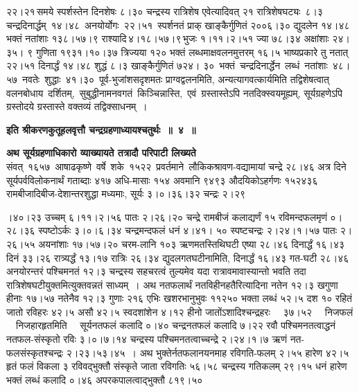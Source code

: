 \documentclass[11pt, openany]{book}
\begin{document}
\noindent २२।२१\textendash \,समये स्पर्शस्तेन दिनशेषः ८।३० चन्द्रस्य रात्रिशेष एवेत्यादिवत् २१ रात्रिशेषघट्यः \,८।३ \,चन्द्रदिनार्द्धम् \,१४।४८ \,अनयोर्योगः \,२२।५१ \,स्पर्शनतं प्राक् \;खाङ्कैर्गुणितं \;२००६।३० \;द्युदलेन \;१४।४८ \;भक्तं \;नतांशाः \;१३८।५७।९ राश्यादि\textendash \,४।१८।५७।९\textendash \,भुजः १।११।२।५१ ज्या ७८।३४ अक्षांशाः २४।३५। ९ गुणिता १९३१।१०।३७ त्रिज्यया १२० भक्तं लब्धमाक्षवलनमुत्तरम् १६।५ भाष्यप्रकारे तु नतात् २२।५१ दिनार्द्धं १४।४८ शुद्धं ८।३ खाङ्कैर्गुणितं ७२४। ३० \,भक्तं \,चन्द्रदिनार्द्धेन \,लब्धं \,नतांशाः \,४८।५७ \,नवतेः \,शुद्धाः \,४१।३० \,पूर्व-भुजांशसदृशमतः \;प्राग्वद्वलनमिति, \;अन्यत्यागवत्कार्यमिति \;तद्विशेषत्वात् वलनबोधाय \,दर्शितम्, \,सुबुद्धीनामनवगतं \,किञ्चिन्नास्ति, \,एवं \,ग्रस्तास्तेऽपि नतदिक्स्वयमूह्यम्, सूर्यग्रहणेऽपि ग्रस्तोदये ग्रस्तास्ते वक्तव्यं तद्विक्साधनम्~। 
\vspace{2mm}

\begin{center}
{\large \textbf{इति श्रीकरणकुतूहलवृत्तौ चन्द्रग्रहणाध्यायश्चतुर्थः~॥~४~॥ }}
\end{center}
\vspace{2mm}

{\small \textbf{अथ सूर्यग्रहणाधिकारो व्याख्यायते तत्रादौ परिपाटी लिख्यते\textendash }}\\

संवत् \,१६५७ \,आषाढकृष्णे \,वर्षे \,शके \,१५२२ \,प्रवर्तमाने \,लौकिकश्रावण-वद्यामायां चन्द्रे २८।४६ अत्र दिने सूर्यपर्वविलोकनार्थं गताब्दाः ४१७ अधि-मासाः १५४ अवमानि ९४९३ औदयिकोऽहर्गणः १५२४३६ रामबीजादिबीज-देशान्तरशुद्धा मध्यमाः, सूर्यः ३।०।३६।३२ चन्द्रः २।२९

\newpage

\noindent ।४०।२३ उच्चम् ६।११।२।५६ पातः २।२६।२० चन्द्रे रामबीजं कलाद्यर्णं १५ रविमन्दफलमृणं ०।२८।३६ स्पष्टोऽर्कः ३।०।६।३४ चन्द्रमन्दफलं धनं ४।४१। ५० स्पष्टचन्द्रः २।२४।१।५७ पातः २।२६।५५ अयनांशाः १७।५७।२० चरम-लानि १०३ ऋणमतस्तिथिघटी एष्या २८।४६ दिनार्द्धं १६।४३ दिनं ३३।२६ रात्र्यर्द्धं १३।१७ रात्रिः २६।३४ द्युदलगतघटीनामिति, दिनार्द्धं १६।४३ गत-घटी २८।४६ अनयोरन्तरं पश्चिमनतं १२।३ चन्द्रस्य सहचरत्वं तुल्यमेव यदा रात्रावमावास्यान्तो \;भवति \;तदा \;रात्रिशेषघटीयुक्तमित्युक्तवन्नतं \;साध्यम्~। अथ नतफलार्थं नतविहीनहतैरित्यादिना नतेन १२।३ खगुणा हीनाः १७।५७ नतेनैव १२।३ गुणाः २१६ एभिः खशरभानुभुवः ११२५० भक्ता लब्धं ५२।५ दश १० रहितं जातो रविहरः ४२।५ असौ ४२।५ स्वदशांशेन ४।१२ हीनो जातोंऽशादिश्चन्द्रहरः ~~३७।५२ ~~निजफलं ~~निजहारहृतमिति ~~सूर्यनतफलं कलादि ०।४० चन्द्रनतफलं कलादि ७।२२ रवौ पश्चिमनतत्वाद्धनं नतफल-संस्कृतो रविः ३।०।७।१४ चन्द्रस्य पश्चिमनतत्वाच्चन्द्रे २।२४।१।७ ऋणं नत-फलसंस्कृतश्चन्द्रः \;२।२३।५३।४५~। अथ \;भुक्तेर्नतफलानयनमाह \;रविगति-फलम् २।५५ हारेण ४२।५ हृतं फलं विकला ३ रविवद्भुक्तौ संस्कृते जाता रविगतिः ५६।५८ चन्द्रस्य गतिकलम् २९।१५ धनं हारेण भक्तं लब्धं कलादि ०।४६ अपरकपालत्वाद्भुक्तौ ८१९।५०
\end{document}
